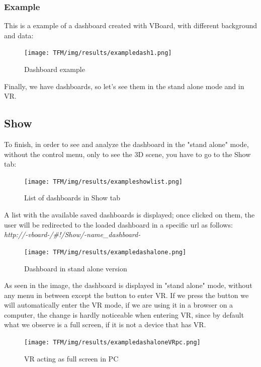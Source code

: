\documentclass[a4paper, 12pt]{book}
\begin{document}
\subsubsection{Example}

This is a example of a dashboard created with VBoard, with different background and data:

\begin{figure}[H]
  \centering
  \texttt{[image: TFM/img/results/exampledash1.png]}
  \caption{Dashboard example}
  \label{fig:onlynodes}
\end{figure}

Finally, we have dashboards, so let's see them in the stand alone mode and in VR.

\subsection{Show}

To finish, in order to see and analyze the dashboard in the "stand alone" mode, without the control menu, only to see the 3D scene, you have to go to the Show tab:

\begin{figure}[H]
  \centering
  \texttt{[image: TFM/img/results/exampleshowlist.png]}
  \caption{List of dashboards in Show tab}
  \label{fig:onlynodes}
\end{figure}

A list with the available saved dashboards is displayed; once clicked on them, the user will be redirected to the loaded dashboard in a specific url as follows: \textit{http://-vboard-/\#!/Show/-name\_dashboard-}

\begin{figure}[H]
  \centering
  \texttt{[image: TFM/img/results/exampledashalone.png]}
  \caption{Dashboard in stand alone version}
  \label{fig:onlynodes}
\end{figure}

As seen in the image, the dashboard is displayed in "stand alone" mode, without any menu in between except the button to enter VR. If we press the button we will automatically enter the VR mode, if we are using it in a browser on a computer, the change is hardly noticeable when entering VR, since by default what we observe is a full screen, if it is not a device that has VR.


\begin{figure}[H]
  \centering
  \texttt{[image: TFM/img/results/exampledashaloneVRpc.png]}
  \caption{VR acting as full screen in PC}
  \label{fig:onlynodes}
\end{figure}
\end{document}
